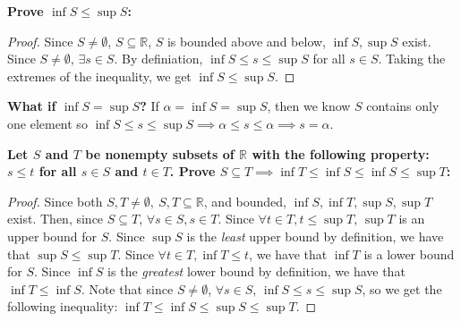 \documentclass{letter}
\begin{document}
\textbf{Prove $\inf{S} \leq \sup{S}$:}
\begin{proof}
  Since $S \neq \emptyset$, $S \subseteq
  \mathbb{R}$, $S$ is bounded above and below, $\inf{S}, \sup{S}$
  exist. Since $S \neq \emptyset$, $\exists s \in S$. By definiation,
  $\inf{S} \leq s \leq \sup{S}$ for all $s \in S$. Taking the extremes of the
  inequality, we get $\inf{S} \leq \sup{S}$.
\end{proof}
\textbf{What if $\inf{S} = \sup{S}$?} If $\alpha = \inf{S} = \sup{S}$, then we
know $S$ contains only one element so $\inf{S} \leq s \leq \sup{S}
\implies \alpha \leq s \leq \alpha \implies s = \alpha$.

\textbf{Let $S$ and $T$ be nonempty subsets of $\mathbb{R}$ with the
  following property: $s \leq t$ for all $s \in S$ and $t \in
  T$. Prove $S \subseteq T \implies \inf{T} \leq \inf{S} \leq \inf{S} \leq \sup{T}$:}
\begin{proof}
  Since both $S, T \neq \emptyset, \ S, T \subseteq \mathbb{R}$, and
  bounded, $\inf{S}, \inf{T}, \sup{S}, \sup{T}$ exist. Then, since $S
  \subseteq T$, $\forall s \in S, s \in T$. Since $\forall t \in T, t
  \leq \sup{T}$, $\sup{T}$ is an upper bound for $S$. Since $\sup{S}$
  is the \textit{least} upper bound by definition, we have that
  $\sup{S} \leq \sup{T}$. Since $\forall t \in T, \inf{T} \leq t$, we
  have that $\inf{T}$ is a lower bound for $S$. Since $\inf{S}$ is the
  \textit{greatest} lower bound by definition, we have that $\inf{T}
  \leq \inf{S}$. Note that since $S \neq \emptyset$, $\forall s \in
  S$, $\inf{S} \leq s \leq \sup{S}$, so we get the following
  inequality: $\inf{T} \leq \inf{S} \leq \sup{S} \leq \sup{T}$.
\end{proof}
\end{document}
